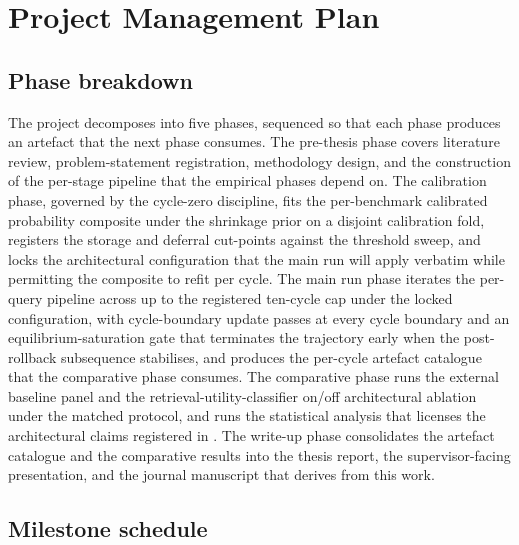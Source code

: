 \section{Project Management Plan}
\label{sec:project-management}

\subsection{Phase breakdown}
\label{sec:pm-phases}

The project decomposes into five phases, sequenced so that each phase produces an artefact that the next phase consumes. The pre-thesis phase covers literature review, problem-statement registration, methodology design, and the construction of the per-stage pipeline that the empirical phases depend on. The calibration phase, governed by the cycle-zero discipline, fits the per-benchmark calibrated probability composite under the shrinkage prior on a disjoint calibration fold, registers the storage and deferral cut-points against the threshold sweep, and locks the architectural configuration that the main run will apply verbatim while permitting the composite to refit per cycle. The main run phase iterates the per-query pipeline across up to the registered ten-cycle cap under the locked configuration, with cycle-boundary update passes at every cycle boundary and an equilibrium-saturation gate that terminates the trajectory early when the post-rollback subsequence stabilises, and produces the per-cycle artefact catalogue that the comparative phase consumes. The comparative phase runs the external baseline panel and the retrieval-utility-classifier on/off architectural ablation under the matched protocol, and runs the statistical analysis that licenses the architectural claims registered in . The write-up phase consolidates the artefact catalogue and the comparative results into the thesis report, the supervisor-facing presentation, and the journal manuscript that derives from this work.

\subsection{Milestone schedule}
\label{sec:pm-milestones}

